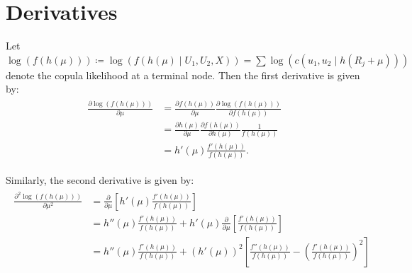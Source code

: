 \documentclass{amsart}
\begin{document}
\section{Derivatives}
Let $\log(f(h(\mu)))\coloneqq \log(f(h(\mu)\mid U_1,U_2,X)) = \sum\log\left(c(u_1,u_2\mid h(R_j+\mu))\right)$ denote the copula likelihood at a terminal node. Then the first derivative is given by:
\begin{align}
	\begin{split}
		\frac{\partial \log(f(h(\mu)))}{\partial \mu} 
		& = \frac{\partial f(h(\mu))}{\partial \mu}\frac{\partial \log(f(h(\mu)))}{\partial f(h(\mu))}\\
		& = \frac{\partial h(\mu)}{\partial \mu}\frac{\partial f(h(\mu))}{\partial h(\mu)}\frac{1}{f(h(\mu))} \\
		& = h'(\mu)\frac{f'(h(\mu))}{f(h(\mu))}.
	\end{split}
\end{align}

Similarly, the second derivative is given by:
\begin{align}
	\begin{split}
		\frac{\partial^2 \log(f(h(\mu)))}{\partial \mu^2}
		& = \frac{\partial}{\partial \mu}\left[h'(\mu)\frac{f'(h(\mu))}{f(h(\mu))}\right]\\
		& = h''(\mu)\frac{f'(h(\mu))}{f(h(\mu))} 
			+ h'(\mu)\frac{\partial}{\partial \mu}\left[\frac{f'(h(\mu))}{f(h(\mu))}\right]\\
		& = h''(\mu)\frac{f'(h(\mu))}{f(h(\mu))} 
		+ \left(h'(\mu)\right)^2\left[\frac{f''(h(\mu))}{f(h(\mu))} - \left(\frac{f'(h(\mu))}{f(h(\mu))}\right)^2\right]
	\end{split}
\end{align}



\end{document}
